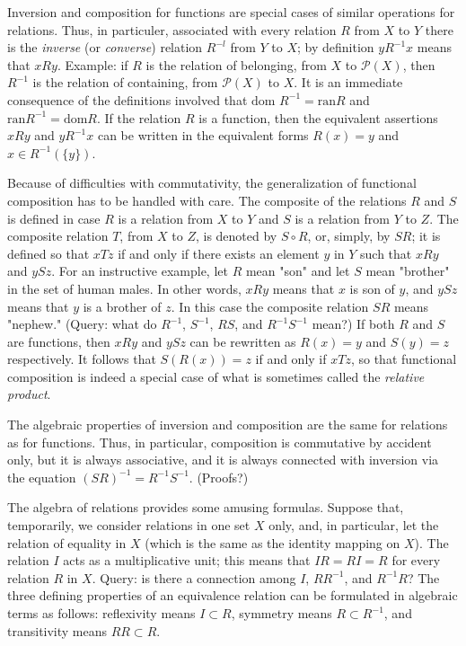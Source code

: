 Inversion and composition for functions are special cases of similar operations for relations. Thus, in particuler, associated with every relation $R$ from $X$ to $Y$ there is the \textit{inverse} (or \textit{converse}) relation $R^{-l}$ from $Y$ to $X$; by definition $y R^{-1} x$ means that $xRy$. Example: if $R$ is the relation of belonging, from $X$ to $\mathcal{P}(X)$, then $R^{-1}$ is the relation of containing, from $\mathcal{P}(X)$ to $X$. It is an immediate consequence of the definitions involved that $\text{dom }R^{-1} = \text{ran} R$ and $\text{ran}R^{-1} = \text{dom} R$. If the relation $R$ is a function, then the equivalent assertions $xRy$ and $yR^{-1}x$ can be written in the equivalent forms $R(x) = y$ and $x \in R^{-1}( \{ y \} )$. 

Because of difficulties with commutativity, the generalization of functional composition has to be handled with care. The composite of the relations $R$ and $S$ is defined in case $R$ is a relation from $X$ to $Y$ and $S$ is a relation from $Y$ to $Z$. The composite relation $T$, from $X$ to $Z$, is denoted by $S \circ R$, or, simply, by $SR$; it is defined so that $xTz$ if and only if there exists an element $y$ in $Y$ such that $xRy$ and $ySz$. For an instructive example, let $R$ mean "son" and let $S$ mean "brother" in the set of human males. In other words, $xRy$ means that $x$ is son of $y$, and $ySz$ means that $y$ is a brother of $z$. In this case the composite relation $SR$ means "nephew." (Query: what do $R^{-1}$, $S^{-1}$, $RS$, and $R^{-1}S^{-1}$ mean?) If both $R$ and $S$ are functions, then $xRy$ and $ySz$ can be rewritten as $R(x) = y$ and $S(y) = z$ respectively. It follows that $S(R(x)) = z$ if and only if $xTz$, so that functional composition is indeed a special case of what is sometimes called the \textit{relative product}.

The algebraic properties of inversion and composition are the same for relations as for functions. Thus, in particular, composition is commutative by accident only, but it is always associative, and it is always connected with inversion via the equation $(SR)^{-1} = R^{-1}S^{-1}$. (Proofs?) 

The algebra of relations provides some amusing formulas.   Suppose that, temporarily, we consider relations in one set $X$ only, and, in particular, let the relation of equality in $X$ (which is the same as the identity mapping on $X$). The relation $I$ acts as a multiplicative unit; this means that $IR = RI = R$ for every relation $R$ in $X$. Query: is there a connection among $I$, $RR^{-1}$, and $R^{-1}R$? The three defining properties of an equivalence relation can be formulated in algebraic terms as follows: reflexivity means $I \subset R$, symmetry means $R \subset R^{-1}$, and transitivity means $RR \subset R$. 

